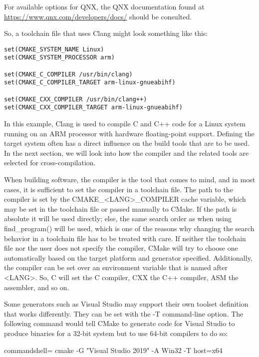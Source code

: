 For available options for QNX, the QNX documentation found at \url{https://www.qnx.com/developers/docs/} should be consulted.

So, a toolchain file that uses Clang might look something like this:

\begin{lstlisting}[style=styleCMake]
set(CMAKE_SYSTEM_NAME Linux)
set(CMAKE_SYSTEM_PROCESSOR arm)

set(CMAKE_C_COMPILER /usr/bin/clang)
set(CMAKE_C_COMPILER_TARGET arm-linux-gnueabihf)

set(CMAKE_CXX_COMPILER /usr/bin/clang++)
set(CMAKE_CXX_COMPILER_TARGET arm-linux-gnueabihf)
\end{lstlisting}

In this example, Clang is used to compile C and C++ code for a Linux system running on an ARM processor with hardware floating-point support. Defining the target system often has a direct influence on the build tools that are to be used. In the next section, we will look into how the compiler and the related tools are selected for cross-compilation.


When building software, the compiler is the tool that comes to mind, and in most cases, it is sufficient to set the compiler in a toolchain file. The path to the compiler is set by the CMAKE\_<LANG>\_COMPILER cache variable, which may be set in the toolchain file or passed manually to CMake. If the path is absolute it will be used directly; else, the same search order as when using find\_program() will be used, which is one of the reasons why changing the search behavior in a toolchain file has to be treated with care. If neither the toolchain file nor the user does not specify the compiler, CMake will try to choose one automatically based on the target platform and generator specified. Additionally, the compiler can be set over an environment variable that is named after <LANG>. So, C will set the C compiler, CXX the C++ compiler, ASM the assembler, and so on.

Some generators such as Visual Studio may support their own toolset definition that
works differently. They can be set with the -T command-line option. The following
command would tell CMake to generate code for Visual Studio to produce binaries
for a 32-bit system but to use 64-bit compilers to do so:

\begin{tcblisting}{commandshell={}}
cmake -G "Visual Studio 2019" -A Win32 -T host=x64
\end{tcblisting}

